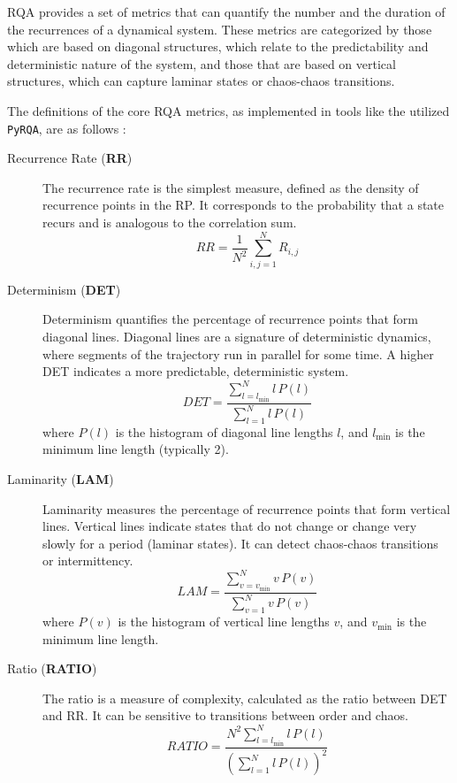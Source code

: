 \documentclass{article}
\begin{document}
					RQA provides a set of metrics that can quantify the 
					number and the duration of the recurrences of a dynamical system.
					These metrics are categorized by those which are based on diagonal structures, 
					which relate to the predictability and deterministic nature of the system, 
					and those that are based on vertical structures, which can capture laminar 
					states or chaos-chaos transitions.

					The definitions of the core RQA metrics, as implemented in tools like the utilized \texttt{PyRQA}, 
					are as follows \cite{marwan_website}:

					\begin{description}

					\item[Recurrence Rate (\textbf{RR})]
					The recurrence rate is the simplest measure, defined as the density of recurrence points in the RP. It corresponds to the probability that a state recurs and is analogous to the correlation sum.
					\[
					RR = \frac{1}{N^2} \sum_{i,j=1}^{N} R_{i,j}
					\]

					\item[Determinism (\textbf{DET})]
					Determinism quantifies the percentage of recurrence points that form diagonal lines. Diagonal lines are a signature of deterministic dynamics, where segments of the trajectory run in parallel for some time. A higher DET indicates a more predictable, deterministic system.
					\[
					DET = \frac{\sum_{l=l_{\text{min}}}^{N} l \, P(l)}{\sum_{l=1}^{N} l \, P(l)}
					\]
					where \( P(l) \) is the histogram of diagonal line lengths \( l \), and \( l_{\text{min}} \) is the minimum line length (typically 2).

					\item[Laminarity (\textbf{LAM})]
					Laminarity measures the percentage of recurrence points that form vertical lines. Vertical lines indicate states that do not change or change very slowly for a period (laminar states). It can detect chaos-chaos transitions or intermittency.
					\[
					LAM = \frac{\sum_{v=v_{\text{min}}}^{N} v \, P(v)}{\sum_{v=1}^{N} v \, P(v)}
					\]
					where \( P(v) \) is the histogram of vertical line lengths \( v \), and \( v_{\text{min}} \) is the minimum line length.

					\item[Ratio (\textbf{RATIO})]
					The ratio is a measure of complexity, calculated as the ratio between DET and RR. It can be sensitive to transitions between order and chaos.
					\[
					RATIO = \frac{N^2 \sum_{l=l_{\text{min}}}^{N} l \, P(l)}{\left( \sum_{l=1}^{N} l \, P(l) \right)^2}
					\]


\end{description}
\end{document}
